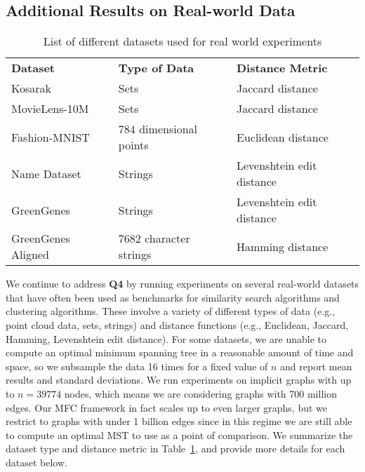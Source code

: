 \subsection{Additional Results on Real-world Data}
\begin{table}[t]
	\centering
	\caption{List of different datasets used for real world experiments}
	\label{tab:data}
	\begin{tabular}{ lll } 
		\toprule
		\textbf{Dataset} & \textbf{Type of Data} & \textbf{Distance Metric} \\
		\cmidrule(lr){1-3}
		Kosarak\cite{annBenchmarks, kosarak} & Sets & Jaccard distance \\
		MovieLens-10M\cite{annBenchmarks, movie_lens} & Sets & Jaccard distance \\
		Fashion-MNIST\cite{annBenchmarks, fashion_mnist} & $784$ dimensional points & Euclidean distance \\
		Name Dataset\cite{nameDataset2021} & Strings & Levenshtein edit distance \\
		GreenGenes\cite{greengenesDataset} & Strings & Levenshtein edit distance \\
		GreenGenes Aligned\cite{greengenesDataset} & 7682 character strings & Hamming distance\\
		\bottomrule
	\end{tabular}
\end{table}
We continue to address \textbf{Q4} by running experiments on several real-world datasets that have often been used as benchmarks for similarity search algorithms and clustering algorithms. These involve a variety of different types of data (e.g., point cloud data, sets, strings) and distance functions (e.g., Euclidean, Jaccard, Hamming, Levenshtein edit distance). For some datasets, we are unable to compute an optimal minimum spanning tree in a reasonable amount of time and space, so we subsample the data 16 times for a fixed value of $n$ and report mean results and standard deviations. We run experiments on implicit graphs with up to $n = 39774$ nodes, which means we are considering graphs with 700 million edges. Our MFC framework in fact scales up to even larger graphs, but we restrict to graphs with under 1 billion edges since in this regime we are still able to compute an optimal MST to use as a point of comparison. We summarize the dataset type and distance metric in Table~\ref{tab:data}, and provide more details for each dataset below.

